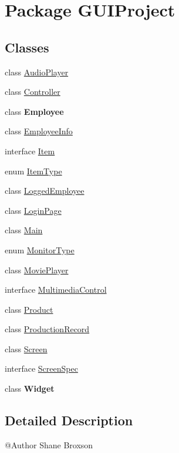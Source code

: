 \hypertarget{namespace_g_u_i_project}{}\section{Package G\+U\+I\+Project}
\label{namespace_g_u_i_project}
\subsection*{Classes}
\begin{DoxyCompactItemize}
\item 
class \mbox{\hyperlink{class_g_u_i_project_1_1_audio_player}{Audio\+Player}}
\item 
class \mbox{\hyperlink{class_g_u_i_project_1_1_controller}{Controller}}
\item 
class {\bfseries Employee}
\item 
class \mbox{\hyperlink{class_g_u_i_project_1_1_employee_info}{Employee\+Info}}
\item 
interface \mbox{\hyperlink{interface_g_u_i_project_1_1_item}{Item}}
\item 
enum \mbox{\hyperlink{enum_g_u_i_project_1_1_item_type}{Item\+Type}}
\item 
class \mbox{\hyperlink{class_g_u_i_project_1_1_logged_employee}{Logged\+Employee}}
\item 
class \mbox{\hyperlink{class_g_u_i_project_1_1_login_page}{Login\+Page}}
\item 
class \mbox{\hyperlink{class_g_u_i_project_1_1_main}{Main}}
\item 
enum \mbox{\hyperlink{enum_g_u_i_project_1_1_monitor_type}{Monitor\+Type}}
\item 
class \mbox{\hyperlink{class_g_u_i_project_1_1_movie_player}{Movie\+Player}}
\item 
interface \mbox{\hyperlink{interface_g_u_i_project_1_1_multimedia_control}{Multimedia\+Control}}
\item 
class \mbox{\hyperlink{class_g_u_i_project_1_1_product}{Product}}
\item 
class \mbox{\hyperlink{class_g_u_i_project_1_1_production_record}{Production\+Record}}
\item 
class \mbox{\hyperlink{class_g_u_i_project_1_1_screen}{Screen}}
\item 
interface \mbox{\hyperlink{interface_g_u_i_project_1_1_screen_spec}{Screen\+Spec}}
\item 
class {\bfseries Widget}
\end{DoxyCompactItemize}


\subsection{Detailed Description}
@\+Author Shane Broxson 
